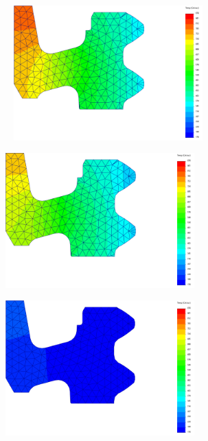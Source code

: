 \begin{figure}[htb]
    \centering
    \begin{subfigure}{.33\textwidth}\
        \centering
        \includegraphics[width = 0.8\textwidth]{Figures/Cap4/AC3_Diametro.png}
        \caption[]%
        {}
        \label{fig:A3_Dint}
    \end{subfigure}%
    \begin{subfigure}{.33\textwidth}
        \centering
        \includegraphics[width = 0.8\textwidth]{Figures/Cap4/AC1_Diametro.png}
        \caption{}
        \label{fig:A1_Dint}
    \end{subfigure}
    \begin{subfigure}{.33\textwidth}
        \centering
        \includegraphics[width = 0.8\textwidth]{Figures/Cap4/TF_Diametro.png}

\end{subfigure}
\end{figure}

